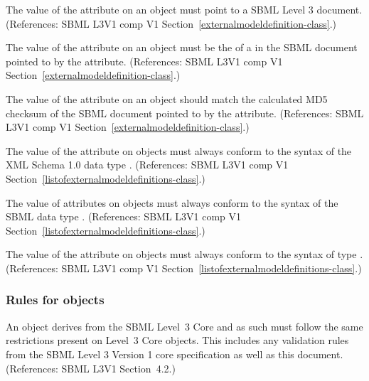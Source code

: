 \begin{sbmlenum}
 { The value of the  attribute on an
  \ExternalModelDefinition object must point to a SBML Level 3 document.
  (References: SBML L3V1 comp V1 Section~\ref{externalmodeldefinition-class}.) }


 { The value of the  attribute on an
  \ExternalModelDefinition object must be the  of a \Model
  in the SBML document pointed to by the  attribute.
  (References: SBML L3V1 comp V1 Section~\ref{externalmodeldefinition-class}.) }


 { The value of the  attribute on an
  \ExternalModelDefinition object should match the
  calculated MD5 checksum of the SBML document pointed to by the 
   attribute.
  (References: SBML L3V1 comp V1 Section~\ref{externalmodeldefinition-class}.) }


 { The value of the  attribute on
  \ExternalModelDefinition objects must always conform to the syntax of
  the XML Schema 1.0 data type .
  (References: SBML L3V1 comp V1 
  Section~\ref{listofexternalmodeldefinitions-class}.) }


 { The value of  attributes on
  \ExternalModelDefinition objects must always conform to the syntax of
  the SBML data type .
  (References: SBML L3V1 comp V1 
  Section~\ref{listofexternalmodeldefinitions-class}.) }


 { The value of the  attribute on
  \ExternalModelDefinition objects must always conform to the syntax of
  type .
  (References: SBML L3V1 comp V1 
  Section~\ref{listofexternalmodeldefinitions-class}.) }


\end{sbmlenum} \subsubsection*{Rules for  objects} \begin{sbmlenum}

 { An \ModelDefinition object derives from the SBML
  Level~3 Core  and as such must follow the same restrictions 
  present on Level~3 Core \Model objects.
  This includes any validation rules from the SBML Level 3 Version 1
  core specification as well as this document.
   (References: SBML L3V1 Section~4.2.) }


\end{sbmlenum}
